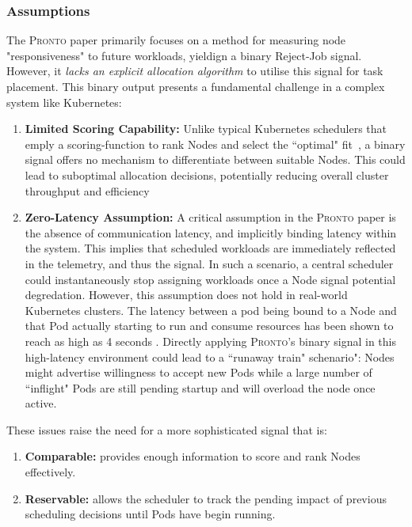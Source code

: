\subsubsection{Assumptions}
The \textsc{Pronto} paper primarily focuses on a method for measuring node
"responsiveness" to future workloads, yieldign a binary Reject-Job signal.
However, it \textit{lacks an explicit allocation algorithm} to utilise this
signal for task placement. This binary output presents a fundamental challenge
in a complex system like Kubernetes:
\begin{enumerate}
    \item \textbf{Limited Scoring Capability:} Unlike typical Kubernetes
        schedulers that emply a scoring-function to rank Nodes and select the
        ``optimal" fit~\cite{kube-scheduler}, a binary signal offers no
        mechanism to differentiate between suitable Nodes. This could lead to
        suboptimal allocation decisions, potentially reducing overall cluster
        throughput and efficiency
    \item \textbf{Zero-Latency Assumption:} A critical assumption in the
        \textsc{Pronto} paper is the absence of communication latency, and
        implicitly binding latency within the system. This implies that
        scheduled workloads are immediately reflected in the telemetry, and thus
        the signal. In such a scenario, a central scheduler could
        instantaneously stop assigning workloads once a Node signal potential
        degredation. However, this assumption does not hold in real-world
        Kubernetes clusters. The latency between a pod being bound to a Node and
        that Pod actually starting to run and consume resources has been shown
        to reach as high as 4 seconds \cite{qadeer_scaling_2022}. Directly
        applying \textsc{Pronto}'s binary signal in this high-latency
        environment could lead to a ``runaway train" schenario": Nodes might
        advertise willingness to accept new Pods while a large number of
        ``inflight" Pods are still pending startup and will overload the node
        once active.
\end{enumerate}
These issues raise the need for a more sophisticated signal that is:
\begin{enumerate}
    \item \textbf{Comparable:} provides enough information to score and rank
        Nodes effectively.
    \item \textbf{Reservable:} allows the scheduler to track the pending impact
        of previous scheduling decisions until Pods have begin running.
\end{enumerate}

